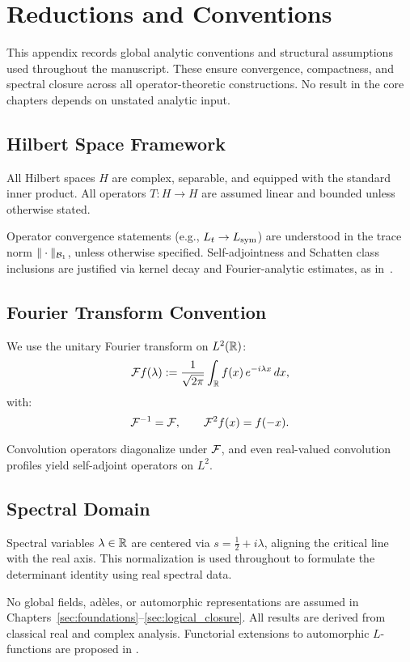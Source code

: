 \section{Reductions and Conventions}
\label{app:reductions_and_conventions}

This appendix records global analytic conventions and structural assumptions used throughout the manuscript. These ensure convergence, compactness, and spectral closure across all operator-theoretic constructions. No result in the core chapters depends on unstated analytic input.

\subsection*{Hilbert Space Framework}

All Hilbert spaces \( H \) are complex, separable, and equipped with the standard inner product. All operators \( T \colon H \to H \) are assumed linear and bounded unless otherwise stated.

Operator convergence statements (e.g., \( L_t \to L_{\mathrm{sym}} \)) are understood in the trace norm \( \|\cdot\|_{\mathcal{B}_1} \), unless otherwise specified. Self-adjointness and Schatten class inclusions are justified via kernel decay and Fourier-analytic estimates, as in~\cite{Simon2005TraceIdeals, ReedSimon1980I}.

\subsection*{Fourier Transform Convention}

We use the unitary Fourier transform on \( L^2(\mathbb{R}) \):
\[
\mathcal{F} f(\lambda) := \frac{1}{\sqrt{2\pi}} \int_{\mathbb{R}} f(x)\, e^{-i\lambda x}\, dx,
\]
with:
\[
\mathcal{F}^{-1} = \mathcal{F}, \qquad \mathcal{F}^2 f(x) = f(-x).
\]

Convolution operators diagonalize under \( \mathcal{F} \), and even real-valued convolution profiles yield self-adjoint operators on \( L^2 \).

\subsection*{Spectral Domain}

Spectral variables \( \lambda \in \mathbb{R} \) are centered via \( s = \tfrac{1}{2} + i\lambda \), aligning the critical line with the real axis. This normalization is used throughout to formulate the determinant identity using real spectral data.

No global fields, adèles, or automorphic representations are assumed in Chapters~\ref{sec:foundations}–\ref{sec:logical_closure}. All results are derived from classical real and complex analysis. Functorial extensions to automorphic \( L \)-functions are proposed in .


